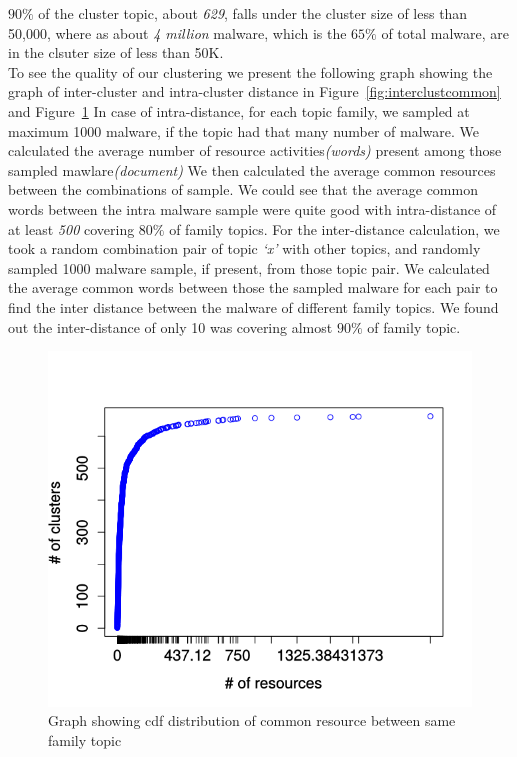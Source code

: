 $90\%$ of the cluster topic, about \emph{629}, falls under the cluster size of less than 50,000, where as about \emph{4 million} malware, which is the $65\%$ of total malware, are in the clsuter size of less than 50K.\\
To see the quality of our clustering we present the following graph showing the graph of inter-cluster and intra-cluster distance in Figure~\ref{fig:interclustcommon} and Figure~\ref{fig:intraclustcommon}
In case of intra-distance, for each topic family, we sampled at maximum 1000 malware, if the topic had that many number of malware. We calculated the average number of resource activities\textit{(words)} present among those sampled mawlare\textit{(document)}
We then calculated the average common resources between the combinations of sample. We could see that the average common words between the intra malware sample were quite good with intra-distance of at least \emph{500} covering $80\%$ of family topics.
For the inter-distance calculation, we took a random combination pair of topic \emph{`x'} with other topics, and randomly sampled 1000 malware sample, if present, from those topic pair.
We calculated the average common words between those the sampled malware for each pair to find the inter distance between the malware of different family topics.
We found out the inter-distance of only 10 was covering almost $90\%$ of family topic.
\begin{figure}
\begin{center}
  \includegraphics[scale=0.7]{figures/intra_clustered_common.png}
\end{center}
\captionsetup{font=small}
\caption{ Graph showing cdf distribution of common resource between same family topic}
\label{fig:intraclustcommon}
\end{figure}
